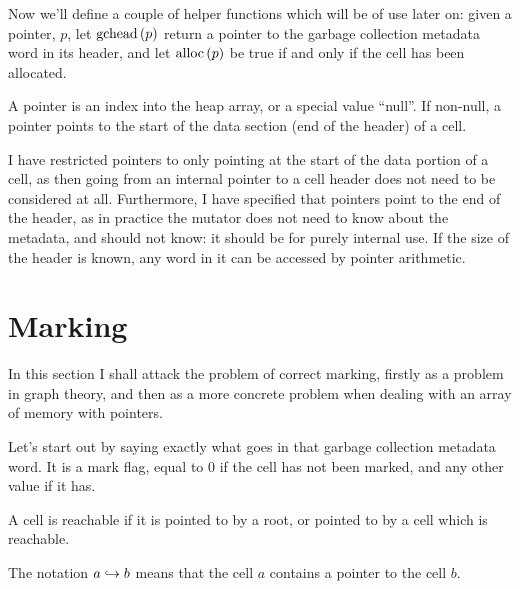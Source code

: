Now we'll define a couple of helper functions which will be of use
later on: given a \gls{pointer}, $p$, let $\gchead{p}$ return a pointer to the
\gls{garbage collection} metadata word in its header, and let
$\alloc{p}$ be true if and only if the \gls{cell} has been allocated.

\begin{definition}[Pointer]
  A pointer is an index into the heap array, or a special value
  ``null''. If non-null, a pointer points to the start of the data
  section (end of the header) of a cell.
\end{definition}

I have restricted \glspl{pointer} to only pointing at the start of the
data portion of a \gls{cell}, as then going from an internal
\gls{pointer} to a cell header does not need to be considered at
all. Furthermore, I have specified that \glspl{pointer} point to the
end of the header, as in practice the \gls{mutator} does not need to
know about the metadata, and should not know: it should be for purely
internal use. If the size of the header is known, any word in it can
be accessed by \gls{pointer} arithmetic.

\section{Marking}

In this section I shall attack the problem of correct marking, firstly
as a problem in graph theory, and then as a more concrete problem when
dealing with an array of memory with pointers.

Let's start out by saying exactly what goes in that \gls{garbage
  collection} metadata word. It is a mark flag, equal to 0 if the
\gls{cell} has not been marked, and any other value if it has.

\begin{definition}[Reachable]
  A cell is reachable if it is pointed to by a root, or pointed to by
  a cell which is reachable.

  \begin{minipage}{.5\textwidth}
    \begin{prooftree}
    \end{prooftree}
  \end{minipage}
  \begin{minipage}{.5\textwidth}
    \begin{prooftree}
    \end{prooftree}
  \end{minipage}

  The notation $a \pointsto b$ means that the cell $a$ contains a
  pointer to the cell $b$.
\end{definition}

